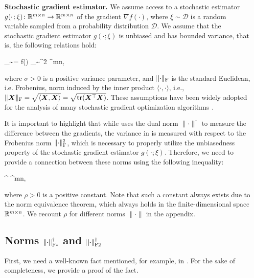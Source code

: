 \documentclass{article} %
\newcommand{\norm}[1]{\lVert #1\rVert}
\newcommand{\Rmn}{\R^{m\times n}}
\newcommand{\cD}{\mathcal{D}}
\newcommand{\Ed}[2]{\mathbb{E}_{#1}\left[#2\right]}
\DeclarePairedDelimiter{\normf}{\|}{\|_\mathrm{F}}
\DeclarePairedDelimiter{\normfstar}{\|}{\|_\mathrm{F*}}
\DeclarePairedDelimiter{\normftwo}{\|}{\|_\mathrm{F2}}
\DeclarePairedDelimiter{\sqnf}{\|}{\|_{\mathrm{F}}^2}
\def\<#1,#2>{\langle #1,#2\rangle}
\newcounter{aequation}
\DeclareMathOperator{\tr}{tr}
\begin{document}
{\bf Stochastic gradient estimator.}
    We assume access to a stochastic estimator $g(\cdot\,;\xi)\colon \Rmn \to \Rmn$ of the gradient $\nabla f(\cdot)$, where $\xi \sim \cD$ is a random variable sampled from a probability distribution $\cD$. We assume that the stochastic gradient estimator $g(\cdot;\xi)$ is unbiased and has bounded variance, that is, the following relations hold:
    \begin{aequation}\label{eq:variance}
    \Ed{\xi \sim \cD}{g(\mX;\xi)} = \nabla f(\mX)
    \quad{}\quad
    \Ed{\xi \sim \cD}{\sqnf{g(\mX;\xi) - \nabla f(\mX)}} \leq \sigma^2
    \quad{}\;
    \mX \in \Rmn,
    \end{aequation}
    where $\sigma > 0$ is a positive variance parameter, and $\normf{\cdot}$ is the standard Euclidean, i.e. Frobenius, norm induced by the inner product $\<\cdot,\cdot>$, i.e., $\normf{\mX} = \sqrt{\<\mX,\mX>}=\sqrt{\tr(\mX^\top \mX)}$. These assumptions have been widely adopted for the analysis of many stochastic gradient optimization algorithms \citep{ghadimi2013stochastic,ghadimi2016accelerated,cutkosky2020momentum,sun2023momentum,horvath2023stochastic,gorbunov2020linearly}.

    It is important to highlight that while  uses the dual norm $\norm{\cdot}^\dagger$ to measure the difference between the gradients, the variance in  is measured with respect to the Frobenius norm $\sqnf{\cdot}$, which is necessary to properly utilize the unbiasedness property of the stochastic gradient estimator $g(\cdot;\xi)$. Therefore, we need to provide a connection between these norms using the following inequality:
    \begin{aequation}\label{eq:norm}
    \norm{\mX}^\dagger \leq \rho\cdot\normf{\mX}
    \quad{}\;
    \mX \in \Rmn,
    \end{aequation}
    where $\rho > 0$ is a positive constant. Note that such a constant always exists due to the norm equivalence theorem, which always holds in the finite-dimensional space $\Rmn$. We recount $\rho$ for different norms $\norm{\cdot}$ in the appendix.


\subsection{Norms $\normfstar{\cdot}^\dagger$ and $\normftwo{\cdot}^\dagger$}
First, we need a well-known fact mentioned, for example, in \cite[Table 1]{yu2012arithmetic}. For the sake of completeness, we provide a proof of the fact.
\end{document}
